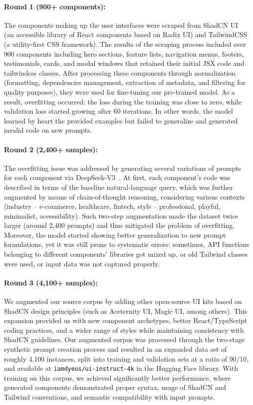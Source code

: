 \documentclass[conference]{IEEEtran}
\begin{document}
\paragraph{Round 1 (900+ components):}
The components making up the user interfaces were scraped from ShadCN UI (an accessible library of React components based on Radix UI) and TailwindCSS (a utility-first CSS framework). The results of the scraping process included over 900 components including hero sections, feature lists, navigation menus, footers, testimonials, cards, and modal windows that retained their initial JSX code and tailwindcss classes. After processing these components through normalization (formatting, dependencies management, extraction of metadata, and filtering for quality purposes), they were used for fine-tuning our pre-trained model. As a result, overfitting occurred: the loss during the training was close to zero, while validation loss started growing after 60 iterations. In other words, the model learned by heart the provided examples but failed to generalize and generated invalid code on new prompts.

\paragraph{Round 2 (2,400+ samples):}
The overfitting issue was addressed by generating several variations of prompts for each component via DeepSeek-V3~\cite{ref6}. At first, each component’s code was described in terms of the baseline natural-language query, which was further augmented by means of chain-of-thought reasoning, considering various contexts (industry – e-commerce, healthcare, fintech, style – professional, playful, minimalist, accessibility). Such two-step augmentation made the dataset twice larger (around 2,400 prompts) and thus mitigated the problem of overfitting. Moreover, the model started showing better generalization to new prompt formulations, yet it was still prone to systematic errors: sometimes, API functions belonging to different components’ libraries got mixed up, or old Tailwind classes were used, or input data was not captured properly.

\paragraph{Round 3 (4,100+ samples):}
We augmented our source corpus by adding other open-source UI kits based on ShadCN design principles (such as Aceternity UI, Magic UI, among others). This expansion provided us with new component archetypes, better React/TypeScript coding practices, and a wider range of styles while maintaining consistency with ShadCN guidelines. Our augmented corpus was processed through the two-stage synthetic prompt creation process and resulted in an expanded data set of roughly 4,100 instances, split into training and validation sets at a ratio of 90/10, and available at \texttt{iamdyeus/ui-instruct-4k} in the Hugging Face library. With training on this corpus, we achieved significantly better performance, where generated components demonstrated proper syntax, usage of ShadCN and Tailwind conventions, and semantic compatibility with input prompts.
\end{document}
